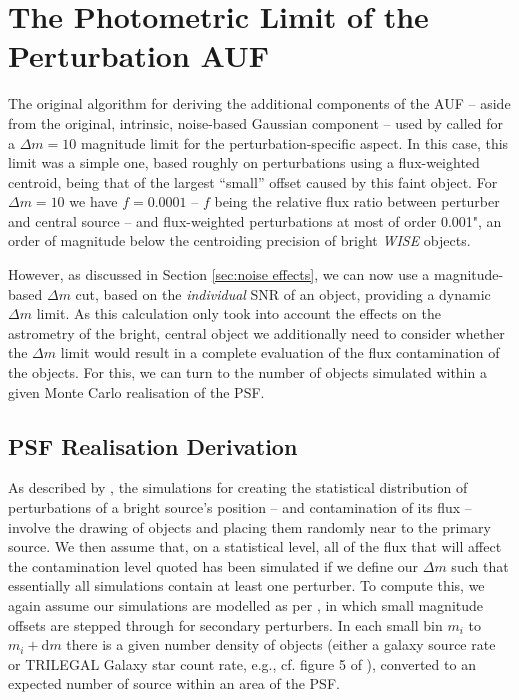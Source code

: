 \documentclass[fleqn,usenatbib]{mnras}
\begin{document}
\section{The Photometric Limit of the Perturbation AUF}
\label{sec:photolimits}
The original algorithm for deriving the additional components of the AUF -- aside from the original, intrinsic, noise-based Gaussian component -- used by \citet{2018MNRAS.481.2148W} called for a $\Delta m = 10$ magnitude limit for the perturbation-specific aspect.
In this case, this limit was a simple one, based roughly on perturbations using a flux-weighted centroid, being that of the largest ``small'' offset caused by this faint object.
For $\Delta m = 10$ we have $f = 0.0001$ -- $f$ being the relative flux ratio between perturber and central source -- and flux-weighted perturbations at most of order 0.001", an order of magnitude below the centroiding precision of bright \textit{WISE} objects.

However, as discussed in Section \ref{sec:noise effects}, we can now use a magnitude-based $\Delta m$ cut, based on the \textit{individual} SNR of an object, providing a dynamic $\Delta m$ limit.
As this calculation only took into account the effects on the astrometry of the bright, central object we additionally need to consider whether the $\Delta m$ limit would result in a complete evaluation of the flux contamination of the objects.
For this, we can turn to the number of objects simulated within a given Monte Carlo realisation of the PSF.

\subsection{PSF Realisation Derivation}
As described by \citet{2018MNRAS.481.2148W}, the simulations for creating the statistical distribution of perturbations of a bright source's position -- and contamination of its flux -- involve the drawing of objects and placing them randomly near to the primary source.
We then assume that, on a statistical level, all of the flux that will affect the contamination level quoted has been simulated if we define our $\Delta m$ such that essentially all simulations contain at least one perturber.
To compute this, we again assume our simulations are modelled as per \citet{2018MNRAS.481.2148W}, in which small magnitude offsets are stepped through for secondary perturbers.
In each small bin $m_i$ to $m_i + \mathrm{d}m$ there is a given number density of objects (either a galaxy source rate or TRILEGAL Galaxy star count rate, e.g., cf. figure 5 of \citealp{2018MNRAS.481.2148W}), converted to an expected number of source within an area of the PSF.
\end{document}
